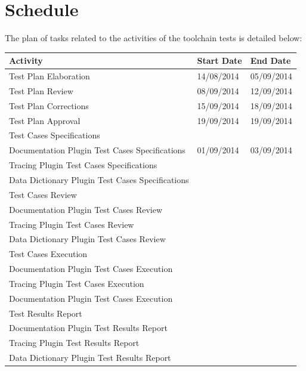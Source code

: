 \section{Schedule}
The plan of tasks related to the activities of the toolchain tests is detailed below:
\begin{table}[htbp]
\centering
\begin{tabular}{|p{8cm}|p{3cm}|p{3cm}|}\hline
\textbf{Activity} & \textbf{Start Date} & \textbf{End Date}\\\hline
Test Plan Elaboration & 14/08/2014 & 05/09/2014 \\\hline
Test Plan Review & 08/09/2014 & 12/09/2014\\\hline
Test Plan Corrections & 15/09/2014 & 18/09/2014\\\hline
Test Plan Approval & 19/09/2014 & 19/09/2014\\\hline
\multicolumn{3}{|l|}{Test Cases Specifications}\\\hline
Documentation Plugin Test Cases Specifications & 01/09/2014 & 03/09/2014\\\hline
Tracing Plugin Test Cases Specifications & & \\\hline
Data Dictionary Plugin Test Cases Specifications & & \\\hline
\multicolumn{3}{|l|}{Test Cases Review}\\\hline
Documentation Plugin Test Cases Review & & \\\hline
Tracing Plugin Test Cases Review & & \\\hline
Data Dictionary Plugin Test Cases Review & & \\\hline
\multicolumn{3}{|l|}{Test Cases Execution}\\\hline
Documentation Plugin Test Cases Execution & & \\\hline
Tracing Plugin Test Cases Execution & & \\\hline
Documentation Plugin Test Cases Execution & & \\\hline
\multicolumn{3}{|l|}{Test Results Report}\\\hline
Documentation Plugin Test Results Report & & \\\hline
Tracing Plugin Test Results Report & & \\\hline
Data Dictionary Plugin Test Results Report & & \\\hline
\end{tabular}
\end{table}


